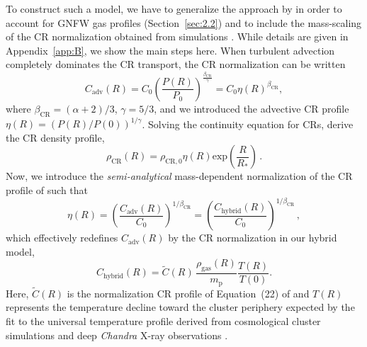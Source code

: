 \documentclass[traditabstract]{aa}
\newcommand{\rmn}{\mathrm}
\begin{document}
To construct such a model, we have to generalize the approach by
\citet{2011A&A...527A..99E} in order to account for GNFW gas profiles
(Section~\ref{sec:2.2}) and to include the mass-scaling of the CR normalization
obtained from simulations \citep{2010MNRAS.409..449P}. While details are given
in Appendix~\ref{app:B}, we show the main steps here. When turbulent advection
completely dominates the CR transport, the CR normalization can be written
\citep{2011A&A...527A..99E}
\begin{equation}
C_{\rmn{adv}}(R)=C_{0} \left( \frac{P(R)}{P_{0}} \right)^{\frac{\beta_{\rmn{CR}}}{\gamma}} = 
C_{0} \eta(R)^{\beta_{\rmn{CR}}},
\label{eq:Csimple_1}
\end{equation} 
where $\beta_{\rmn{CR}}=(\alpha+2)/3$, $\gamma=5/3$, and we introduced the
advective CR profile $\eta(R)=(P(R)/P(0))^{1/\gamma}$. Solving the continuity
equation for CRs, \citet{2011A&A...527A..99E} derive the CR density profile,
\begin{equation}
\rho_{\rmn{CR}}(R) = \rho_{\rmn{CR},0} \eta(R) \rmn{exp} \left( \frac{R}{R_{*}} \right) \, .
\label{eg:rhoCR_1}
\end{equation} 
Now, we introduce the \emph{semi-analytical} mass-dependent normalization of the
CR profile of \cite{2010MNRAS.409..449P} such that
\begin{equation}
\eta(R) = \left( \frac{C_{\rmn{adv}}(R)}{C_0} \right)^{1/\beta_{\rmn{CR}}} = 
\left( \frac{C_{\rmn{hybrid}}(R)}{C_0} \right)^{1/\beta_{\rmn{CR}}} \, ,
\label{eq:eta}
\end{equation} 
which effectively redefines $C_{\rmn{adv}}(R)$ by the CR normalization in our hybrid model,
\begin{equation}
C_{\rmn{hybrid}}(R) =  \tilde{C}(R)\, \frac{\rho_{\rmn{gas}}(R)}{m_\rmn{p}} \frac{T(R)}{T(0)}.
\label{eq:Cf}
\end{equation} 
Here, $\tilde{C}(R)$ is the normalization CR profile of Equation~(22) of
\cite{2010MNRAS.409..449P} and $T(R)$ represents the temperature decline toward
the cluster periphery expected by the fit to the universal temperature profile
derived from cosmological cluster simulations
\citep{2007MNRAS.378..385P,2010MNRAS.409..449P} and deep {\em Chandra} X-ray
observations \citep{2005ApJ...628..655V}.
\end{document}
